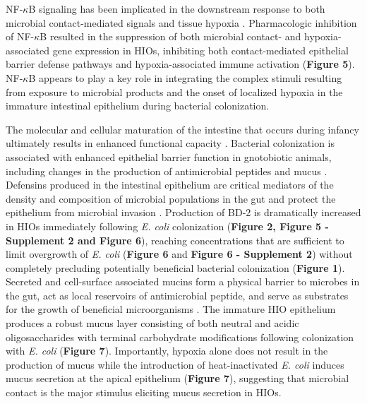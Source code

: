 \documentclass[9pt,lineo]{elife}
\begin{document}
NF-\(\kappa\)B signaling has been implicated in the downstream response to both microbial contact-mediated signals \citep{Zhang:2001,Xiao:2005,Kawai:2007} and tissue hypoxia \citep{Koong:1994,Rius:2008,Arias-Loste:2015,Oliver:2009,Zeitouni:2016,Colgan:2013,Grenz:2012}. Pharmacologic inhibition of NF-\(\kappa\)B resulted in the suppression of both microbial contact- and hypoxia-associated gene expression in HIOs, inhibiting both contact-mediated epithelial barrier defense pathways and hypoxia-associated immune activation (\textbf{Figure 5}). NF-\(\kappa\)B appears to play a key role in integrating the complex stimuli resulting from exposure to microbial products and the onset of localized hypoxia in the immature intestinal epithelium during bacterial colonization.

The molecular and cellular maturation of the intestine that occurs during infancy ultimately results in enhanced functional capacity \citep{Lebenthal:1999,sanderson2000development,Neu:2007}. Bacterial colonization is associated with enhanced epithelial barrier function in gnotobiotic animals, including changes in the production of antimicrobial peptides and mucus \citep{Vaishnava:2008,Cash:2006,Goto:2014,Garcia-Lafuente:2001,Malago:2015,Menard:2008}. Defensins produced in the intestinal epithelium are critical mediators of the density and composition of microbial populations in the gut and protect the epithelium from microbial invasion \citep{Kisich:2001,Ostaff:2013,Cullen:2015,Salzman:2003,Salzman:2010}. Production of BD-2 is dramatically increased in HIOs immediately following \emph{E. coli} colonization (\textbf{Figure 2, Figure 5 -Supplement 2 and Figure 6}), reaching concentrations that are sufficient to limit overgrowth of \emph{E. coli} (\textbf{Figure 6} and \textbf{Figure 6 - Supplement 2}) without completely precluding potentially beneficial bacterial colonization (\textbf{Figure 1}). Secreted and cell-surface associated mucins form a physical barrier to microbes in the gut, act as local reservoirs of antimicrobial peptide, and serve as substrates for the growth of beneficial microorganisms \citep{Desai:2016,Johansson:2016,Cornick:2015,Hansson:2012,Li:2015,Dupont:2014,Bergstrom:2013}. The immature HIO epithelium produces a robust mucus layer consisting of both neutral and acidic oligosaccharides with terminal carbohydrate modifications following colonization with \emph{E. coli} (\textbf{Figure 7}). Importantly, hypoxia alone does not result in the production of mucus while the introduction of heat-inactivated \emph{E. coli} induces mucus secretion at the apical epithelium (\textbf{Figure 7}), suggesting that microbial contact is the major stimulus eliciting mucus secretion in HIOs.
\end{document}
